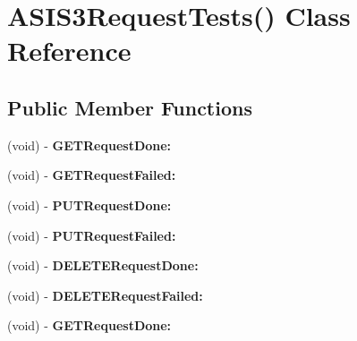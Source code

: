 \hypertarget{interface_a_s_i_s3_request_tests_07_08}{
\section{\-A\-S\-I\-S3\-Request\-Tests() \-Class \-Reference}
\label{interface_a_s_i_s3_request_tests_07_08}
}
\subsection*{\-Public \-Member \-Functions}
\begin{DoxyCompactItemize}
\item 
\hypertarget{interface_a_s_i_s3_request_tests_07_08_a0e42052a3910eeed74b431ee0a5ec2c0}{
(void) -\/ {\bfseries \-G\-E\-T\-Request\-Done\-:}}
\label{interface_a_s_i_s3_request_tests_07_08_a0e42052a3910eeed74b431ee0a5ec2c0}

\item 
\hypertarget{interface_a_s_i_s3_request_tests_07_08_a2a4c80593b1482812eb2a67f16af201a}{
(void) -\/ {\bfseries \-G\-E\-T\-Request\-Failed\-:}}
\label{interface_a_s_i_s3_request_tests_07_08_a2a4c80593b1482812eb2a67f16af201a}

\item 
\hypertarget{interface_a_s_i_s3_request_tests_07_08_ab8e30c51352a9a62f57881f68ede269a}{
(void) -\/ {\bfseries \-P\-U\-T\-Request\-Done\-:}}
\label{interface_a_s_i_s3_request_tests_07_08_ab8e30c51352a9a62f57881f68ede269a}

\item 
\hypertarget{interface_a_s_i_s3_request_tests_07_08_a7d8cb82ae96155bea92ca3d6a584ee9a}{
(void) -\/ {\bfseries \-P\-U\-T\-Request\-Failed\-:}}
\label{interface_a_s_i_s3_request_tests_07_08_a7d8cb82ae96155bea92ca3d6a584ee9a}

\item 
\hypertarget{interface_a_s_i_s3_request_tests_07_08_a34d6029967b072e98779b3540dcc0d48}{
(void) -\/ {\bfseries \-D\-E\-L\-E\-T\-E\-Request\-Done\-:}}
\label{interface_a_s_i_s3_request_tests_07_08_a34d6029967b072e98779b3540dcc0d48}

\item 
\hypertarget{interface_a_s_i_s3_request_tests_07_08_a75602a34fb2c7fccfd3c01dec0b22a43}{
(void) -\/ {\bfseries \-D\-E\-L\-E\-T\-E\-Request\-Failed\-:}}
\label{interface_a_s_i_s3_request_tests_07_08_a75602a34fb2c7fccfd3c01dec0b22a43}

\item 
\hypertarget{interface_a_s_i_s3_request_tests_07_08_a0e42052a3910eeed74b431ee0a5ec2c0}{
(void) -\/ {\bfseries \-G\-E\-T\-Request\-Done\-:}}
\label{interface_a_s_i_s3_request_tests_07_08_a0e42052a3910eeed74b431ee0a5ec2c0}


\end{DoxyCompactItemize}
